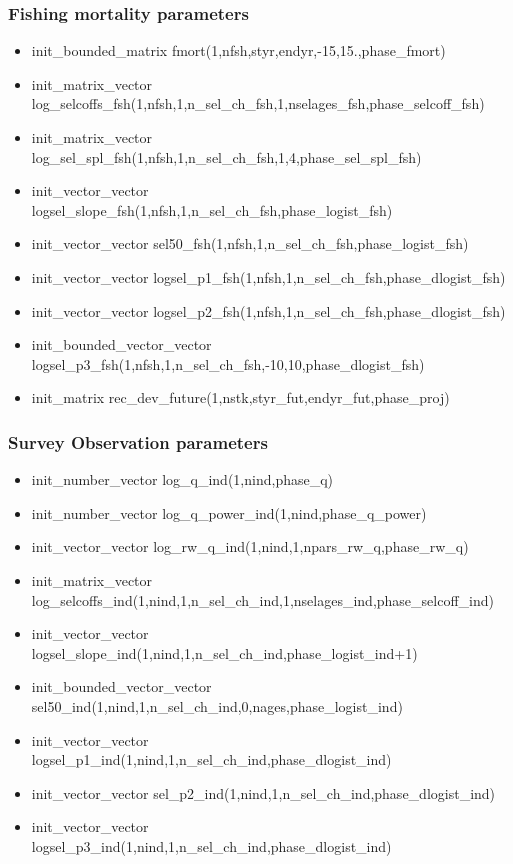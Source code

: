 \documentclass{article}
\begin{document}
\subsubsection{Fishing mortality parameters}
\begin{itemize}
    \item init\_bounded\_matrix fmort(1,nfsh,styr,endyr,-15,15.,phase\_fmort)
    \item init\_matrix\_vector log\_selcoffs\_fsh(1,nfsh,1,n\_sel\_ch\_fsh,1,nselages\_fsh,phase\_selcoff\_fsh)
    \item init\_matrix\_vector  log\_sel\_spl\_fsh(1,nfsh,1,n\_sel\_ch\_fsh,1,4,phase\_sel\_spl\_fsh)
    \item init\_vector\_vector logsel\_slope\_fsh(1,nfsh,1,n\_sel\_ch\_fsh,phase\_logist\_fsh)
    \item init\_vector\_vector     sel50\_fsh(1,nfsh,1,n\_sel\_ch\_fsh,phase\_logist\_fsh)
    \item init\_vector\_vector logsel\_p1\_fsh(1,nfsh,1,n\_sel\_ch\_fsh,phase\_dlogist\_fsh)
    \item init\_vector\_vector logsel\_p2\_fsh(1,nfsh,1,n\_sel\_ch\_fsh,phase\_dlogist\_fsh)
    \item init\_bounded\_vector\_vector logsel\_p3\_fsh(1,nfsh,1,n\_sel\_ch\_fsh,-10,10,phase\_dlogist\_fsh)
    \item init\_matrix rec\_dev\_future(1,nstk,styr\_fut,endyr\_fut,phase\_proj)
\end{itemize}

\subsubsection{Survey Observation parameters}
\begin{itemize}
    \item init\_number\_vector log\_q\_ind(1,nind,phase\_q) 
    \item init\_number\_vector log\_q\_power\_ind(1,nind,phase\_q\_power)
    \item init\_vector\_vector log\_rw\_q\_ind(1,nind,1,npars\_rw\_q,phase\_rw\_q) 
    \item init\_matrix\_vector log\_selcoffs\_ind(1,nind,1,n\_sel\_ch\_ind,1,nselages\_ind,phase\_selcoff\_ind)
    \item init\_vector\_vector logsel\_slope\_ind(1,nind,1,n\_sel\_ch\_ind,phase\_logist\_ind+1)
    \item init\_bounded\_vector\_vector        sel50\_ind(1,nind,1,n\_sel\_ch\_ind,0,nages,phase\_logist\_ind)
    \item init\_vector\_vector logsel\_p1\_ind(1,nind,1,n\_sel\_ch\_ind,phase\_dlogist\_ind)
    \item init\_vector\_vector    sel\_p2\_ind(1,nind,1,n\_sel\_ch\_ind,phase\_dlogist\_ind)
    \item init\_vector\_vector logsel\_p3\_ind(1,nind,1,n\_sel\_ch\_ind,phase\_dlogist\_ind)
\end{itemize}
\end{document}
